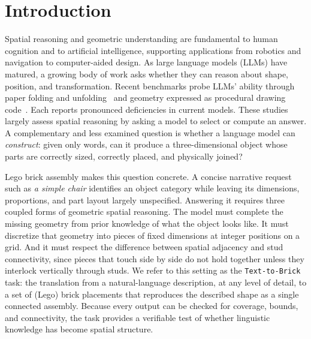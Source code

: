 



\section{Introduction}
Spatial reasoning and geometric understanding are fundamental to human cognition and to artificial intelligence, supporting applications from robotics and navigation to computer-aided design.
As large language models (LLMs) have matured, a growing body of work asks whether they can reason about shape, position, and transformation. Recent benchmarks probe LLMs' ability through 
paper folding and unfolding~\cite{zhou2026paperfoldingpuzzle} and geometry expressed as procedural drawing code~\cite{luo2026geogrambench}. Each reports pronounced deficiencies in current models. These studies largely assess spatial reasoning by asking a model to select or compute an answer. A complementary and less examined question is whether a language model can \emph{construct}: given only words, can it produce a three-dimensional object whose parts are correctly sized, correctly placed, and physically joined?

Lego brick assembly makes this question concrete. A concise narrative request such as \emph{a simple chair} identifies an object category while leaving its dimensions, proportions, and part layout largely unspecified. Answering it requires three coupled forms of geometric spatial reasoning. The model must complete the missing geometry from prior knowledge of what the object looks like. It must discretize that geometry into pieces of fixed dimensions at integer positions on a grid. And it must respect the difference between spatial adjacency and stud connectivity, since pieces that touch side by side do not hold together unless they interlock vertically through studs. We refer to this setting as the \texttt{Text-to-Brick} task: the translation from a natural-language description, at any level of detail, to a set of (Lego) brick placements that reproduces the described shape as a single connected assembly. Because every output can be checked for coverage, bounds, and connectivity, the task provides a verifiable test of whether linguistic knowledge has become spatial structure.

